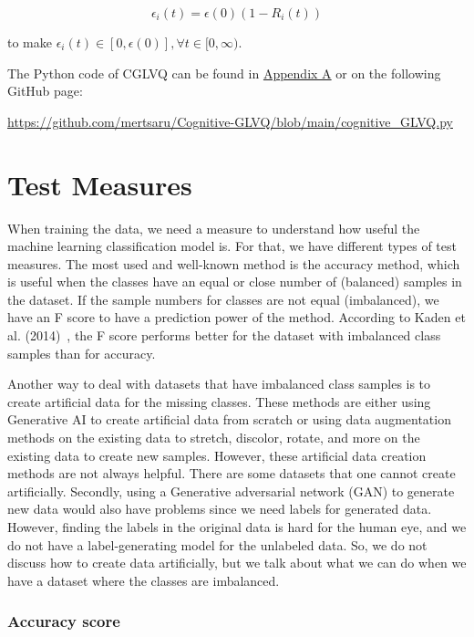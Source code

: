 \begin{equation}
\epsilon_{i}(t) = \epsilon(0)(1 - R_{i}(t))
\end{equation}

to make $\epsilon_{i}(t)\in [0, \epsilon(0)], \forall t \in [0, \infty)$.
\vspace{10pt}

\noindent The Python code of CGLVQ can be found in \hyperlink{appcglvq}{Appendix A} or on the following GitHub page:

\noindent \url{https://github.com/mertsaru/Cognitive-GLVQ/blob/main/cognitive_GLVQ.py}


\section{Test Measures}

When training the data, we need a measure to understand how useful the machine learning classification model is. For that, we have different types of test measures. The most used and well-known method is the accuracy method, which is useful when the classes have an equal or close number of (balanced) samples in the dataset. If the sample numbers for classes are not equal (imbalanced), we have an F score to have a prediction power of the method. According to Kaden et al. (2014)~\cite{kaden}, the F score performs better for the dataset with imbalanced class samples than for accuracy.

Another way to deal with datasets that have imbalanced class samples is to create artificial data for the missing classes. These methods are either using Generative AI to create artificial data from scratch or using data augmentation methods on the existing data to stretch, discolor, rotate, and more on the existing data to create new samples. However, these artificial data creation methods are not always helpful. There are some datasets that one cannot create artificially. Secondly, using a Generative adversarial network (GAN) to generate new data would also have problems since we need labels for generated data. However, finding the labels in the original data is hard for the human eye, and we do not have a label-generating model for the unlabeled data. So, we do not discuss how to create data artificially, but we talk about what we can do when we have a dataset where the classes are imbalanced.


\subsubsection{Accuracy score}

